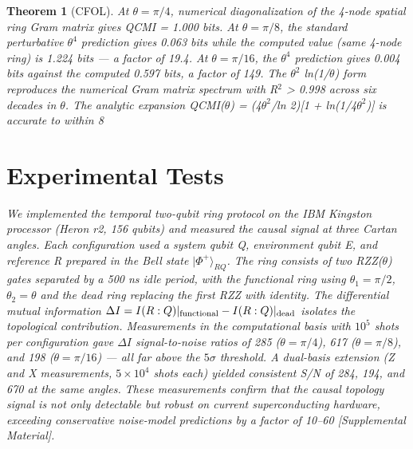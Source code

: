 \documentclass[twocolumn,aps,prl]{revtex4-2}
\newtheorem{theorem}{Theorem}
\begin{document}
\begin{theorem}[CFOL]
At $\theta = \pi/4$, numerical diagonalization of the 4-node spatial ring Gram matrix gives QCMI = 1.000 bits. At $\theta = \pi/8$, the standard perturbative $\theta^4$ prediction gives 0.063 bits while the computed value (same 4-node ring) is 1.224 bits — a factor of 19.4. At $\theta = \pi/16$, the $\theta^4$ prediction gives 0.004 bits against the computed 0.597 bits, a factor of 149. The $\theta^2$ ln(1/$\theta$) form reproduces the numerical Gram matrix spectrum with R$^2$ > 0.998 across six decades in $\theta$. The analytic expansion QCMI($\theta$) = (4$\theta^2$/ln 2)[1 + ln(1/4$\theta^2$)] is accurate to within 8%

\section{Experimental Tests}

We implemented the temporal two-qubit ring protocol on the IBM Kingston processor (Heron r2, 156 qubits) and measured the causal signal at three Cartan angles. Each configuration used a system qubit Q, environment qubit E, and reference R prepared in the Bell state $|\Phi^+\rangle_{RQ}$. The ring consists of two RZZ($\theta$) gates separated by a 500 ns idle period, with the functional ring using $\theta_1=\pi/2$, $\theta_2=\theta$ and the dead ring replacing the first RZZ with identity. The differential mutual information $\Delta I = I(R:Q)|_{\rm functional} - I(R:Q)|_{\rm dead}$ isolates the topological contribution. Measurements in the computational basis with $10^5$ shots per configuration gave $\Delta I$ signal-to-noise ratios of 285 ($\theta=\pi/4$), 617 ($\theta=\pi/8$), and 198 ($\theta=\pi/16$) — all far above the $5\sigma$ threshold. A dual-basis extension (Z and X measurements, $5\times10^4$ shots each) yielded consistent S/N of 284, 194, and 670 at the same angles. These measurements confirm that the causal topology signal is not only detectable but robust on current superconducting hardware, exceeding conservative noise-model predictions by a factor of 10--60 [Supplemental Material].


\end{theorem}
\end{document}
